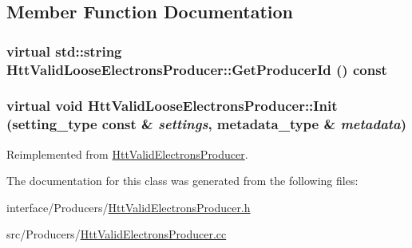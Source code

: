 \subsection{Member Function Documentation}
\hypertarget{classHttValidLooseElectronsProducer_ab185d483224e748d36cdd2af4b38dd08}{
\subsubsection[{GetProducerId}]{\setlength{\rightskip}{0pt plus 5cm}virtual std::string HttValidLooseElectronsProducer::GetProducerId () const}}
\label{classHttValidLooseElectronsProducer_ab185d483224e748d36cdd2af4b38dd08}
\hypertarget{classHttValidLooseElectronsProducer_a5eadcc58c3d058258eb36c9d4ec17aa9}{
\subsubsection[{Init}]{\setlength{\rightskip}{0pt plus 5cm}virtual void HttValidLooseElectronsProducer::Init (setting\_\-type const \& {\em settings}, \/  metadata\_\-type \& {\em metadata})}}
\label{classHttValidLooseElectronsProducer_a5eadcc58c3d058258eb36c9d4ec17aa9}


Reimplemented from \hyperlink{classHttValidElectronsProducer_ae10e80f0e540bbf1d1e85a141b530bd7}{HttValidElectronsProducer}.

The documentation for this class was generated from the following files:\begin{DoxyCompactItemize}
\item 
interface/Producers/\hyperlink{HttValidElectronsProducer_8h}{HttValidElectronsProducer.h}\item 
src/Producers/\hyperlink{HttValidElectronsProducer_8cc}{HttValidElectronsProducer.cc}\end{DoxyCompactItemize}
